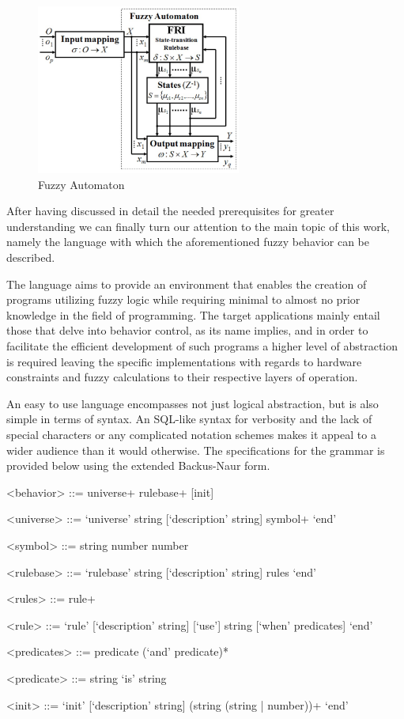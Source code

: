 \begin{figure}[!h]
	\centering
	\includegraphics[width=0.6\textwidth]{images/fuzzy_automaton}
	\caption{Fuzzy Automaton}
\end{figure}

After having discussed in detail the needed prerequisites for greater understanding we can finally turn our attention to the main topic of this work, namely the language with which the aforementioned fuzzy behavior can be described. 


The language aims to provide an environment that enables the creation of programs utilizing fuzzy logic while requiring minimal to almost no prior knowledge in the field of programming. The target applications mainly entail those that delve into behavior control, as its name implies, and in order to facilitate the efficient development of such programs a higher level of abstraction is required leaving the specific implementations with regards to hardware constraints and fuzzy calculations to their respective layers of operation.

An easy to use language encompasses not just logical abstraction, but is also simple in terms of syntax.
An SQL-like syntax for verbosity and the lack of special characters or any complicated notation schemes makes it appeal to a wider audience than it would otherwise. The specifications for the grammar is provided below using the extended Backus-Naur form.

\begin{grammar}
<behavior> ::= universe+ rulebase+ [init]

<universe> ::= `universe' string [`description' string] symbol+ `end'

<symbol> ::= string number number

<rulebase> ::= `rulebase' string [`description' string] rules `end'

<rules> ::= rule+

<rule> ::= `rule' [`description' string] [`use'] string [`when' predicates] `end'

<predicates> ::= predicate (`and' predicate)*

<predicate> ::= string `is' string

<init> ::= `init' [`description' string] (string (string | number))+ `end'
\end{grammar}


